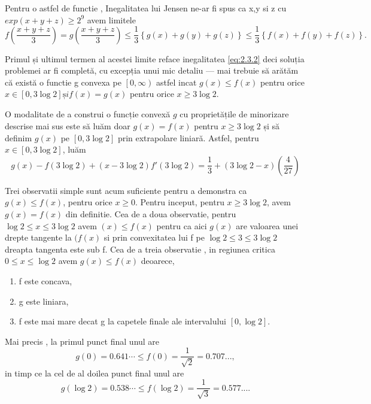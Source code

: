 \documentclass[a4paper,12pt,oneside]{report}
\begin{document}
Pentru o astfel de functie , Inegalitatea lui Jensen ne-ar fi spus ca x,y si z cu \(exp \left ( x + y + z \right )\geq  2^{9} \) avem limitele  
\begin{displaymath}
  f\left ( \frac{x + y + z}{3} \right ) = g\left ( \frac{x + y + z}{3} \right ) \leq  \frac{1}{3}\left \{ g\left ( x \right ) + g\left ( y \right ) + g\left ( z \right ) \right \} \leq  \frac{1}{3}\left \{ f\left ( x \right ) + f\left ( y \right ) + f\left ( z \right ) \right \} .
\end{displaymath}

Primul și ultimul termen al acestei limite reface inegalitatea \ref{eq:2.3.2} deci soluția problemei ar fi completă, cu excepția unui mic detaliu — mai trebuie să arătăm că există o functie  g convexa pe \( \left [ 0 , \infty  \right ) \) astfel incat  \(g\left ( x \right ) \leq  f\left ( x \right )\) pentru orice  \(x \in \left [ 0 , 3\log 2 \right ] și f\left ( x \right ) = g\left ( x \right )\) pentru orice \( x \geq 3\log 2\).

O modalitate de a construi o funcție convexă \(g\) cu proprietățile de minorizare descrise mai sus este să luăm doar \(g\left ( x \right ) = f\left ( x \right )\) pentru \(x \geq  3\log2\) și să definim \(g\left ( x \right )\) pe \(\left [ 0 , 3\log 2 \right ]\) prin extrapolare liniară. Astfel, pentru \(x\in \left [ 0 , 3\log 2 \right ]\), luăm
\begin{displaymath}
  g\left ( x \right ) - f\left ( 3\log 2 \right ) + \left ( x - 3\log 2 \right ){f}'\left ( 3\log2 \right ) = \frac{1}{3} + \left ( 3\log2 - x  \right )\left ( \frac{4}{27} \right )
\end{displaymath}

Trei observatii simple sunt acum suficiente pentru a demonstra ca \(g\left ( x \right )\leq f\left ( x \right )\), pentru orice \(x\geq 0\). Pentru inceput, pentru \(x\geq 3\log 2\), avem \(g\left ( x \right ) = f\left ( x \right )\) din definitie. Cea de a doua observatie, pentru \(\log 2 \leq  x \leq  3\log 2\) avem  \(( x )\leq f\left ( x \right ) \) pentru ca aici  \(g\left ( x \right )\) are valoarea unei drepte tangente la \((f\left ( x \right )\) si prin convexitatea lui f pe \(\log 2 \leq  3 \leq 3\log 2\) dreapta tangenta este sub f. Cea de a treia observatie , in regiunea critica \(0\leq  x \leq \log2\) avem \(g\left ( x \right ) \leq  f\left ( x \right )\) deoarece,  
\begin{enumerate}
  \item f este concava,
  \item g este liniara, 
  \item f este mai mare decat g la capetele finale ale intervalului \(\left [ 0 , \log 2 \right ]\).
\end{enumerate}
Mai precis , la primul punct final unul are 
\begin{displaymath}
  g\left ( 0 \right ) = 0.641\cdots \leq f\left ( 0 \right ) = \frac{1}{\sqrt{2}} = 0.707...,
\end{displaymath}
in timp ce la cel de al doilea punct final unul are  
\begin{displaymath}
  g\left ( \log 2 \right ) = 0.538\cdots  \leq f\left ( \log2 \right ) = \frac{1}{\sqrt{3}} = 0.577... .
\end{displaymath}
\end{document}
